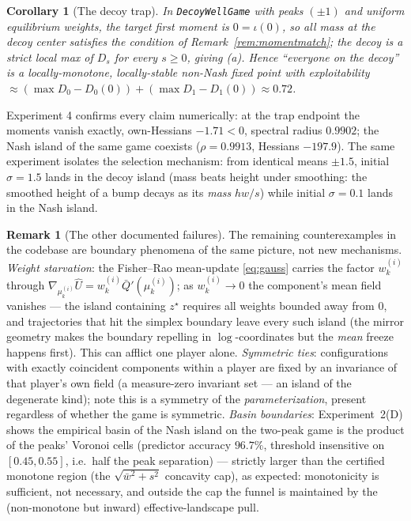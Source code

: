 \documentclass[11pt]{article}
\newtheorem{corollary}{Corollary}
\theoremstyle{definition}
\newtheorem{remark}{Remark}
\begin{document}
\begin{corollary}[The decoy trap]\label{cor:decoy}
In \texttt{DecoyWellGame} with peaks $(\pm 1)$ and uniform equilibrium weights,
the target first moment is $0 = \iota(0)$, so all mass at the decoy center
satisfies the condition of Remark~\ref{rem:momentmatch}; the decoy is a strict
local max of $D_s$ for every $s \ge 0$, giving (a). Hence ``everyone on the
decoy'' is a locally-monotone, locally-stable non-Nash fixed point with
exploitability $\approx (\max D_0 - D_0(0)) + (\max D_1 - D_1(0)) \approx 0.72$.
\end{corollary}

Experiment 4 confirms every claim numerically: at the trap endpoint the
moments vanish exactly, own-Hessians $-1.71 < 0$, spectral radius $0.9902$;
the Nash island of the same game coexists ($\rho = 0.9913$, Hessians
$-197.9$). The same experiment isolates the selection mechanism: from
identical means $\pm 1.5$, initial $\sigma = 1.5$ lands in the decoy island
(mass beats height under smoothing: the smoothed height of a bump decays as
its \emph{mass} $h w / s$) while initial $\sigma = 0.1$ lands in the Nash
island.

\begin{remark}[The other documented failures]
The remaining counterexamples in the codebase are boundary phenomena of the
same picture, not new mechanisms. \emph{Weight starvation}: the Fisher--Rao
mean-update \eqref{eq:gauss} carries the factor $w^{(i)}_k$ through
$\nabla_{\mu^{(i)}_k} \widehat U = w^{(i)}_k \bar Q'(\mu^{(i)}_k)$; as
$w^{(i)}_k \to 0$ the component's mean field vanishes --- the island containing
$z^\star$ requires all weights bounded away from $0$, and trajectories that hit
the simplex boundary leave every such island (the mirror geometry makes the
boundary repelling in $\log$-coordinates but the \emph{mean} freeze happens
first). This can afflict one player alone. \emph{Symmetric ties}:
configurations with exactly coincident components within a player are fixed by
an invariance of that player's own field (a measure-zero invariant set --- an
island of the degenerate kind); note this is a symmetry of the
\emph{parameterization}, present regardless of whether the game is symmetric.
\emph{Basin boundaries}: Experiment~2(D) shows the empirical basin of the Nash
island on the two-peak game is the product of the peaks' Voronoi cells
(predictor accuracy $96.7\%$, threshold insensitive on $[0.45, 0.55]$, i.e.\
half the peak separation) --- strictly larger than the certified monotone region
(the $\sqrt{\bar w^2 + s^2}$ concavity cap), as expected: monotonicity is
sufficient, not necessary, and outside the cap the funnel is maintained by the
(non-monotone but inward) effective-landscape pull.
\end{remark}
\end{document}
